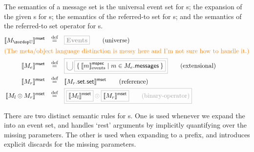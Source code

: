 \begin{definition}[\mmessageset]

  The semantics of a message set is the universal event set for \muniversemessageset s;
  the expansion of the given \mmessagespec s for \mextensionalmessageset s;
  the semantics of the referred-to set for \mrefmessageset s;
  and the semantics of the referred-to set operator for \mbinarymessageset s.
%
\begin{align*}
  \msgsetsema{\aumsgset}
  \quad\defeq\quad
  &
    \tlang{\events}
    \tag{universe}
  \\
  \intertext{\todo{The meta/object language distinction is messy here
  and I'm not sure how to handle it.}}
  \msgsetsema{\anemsgset}
  \quad\defeq\quad
  &
    \tlang{
    \bigcup
    \olang{
    \Set{
    \emspecsema{\amspec} | \amspec \in \field{\anemsgset}{messages}
    }
    }
    }
    \tag{extensional}
  \\
  \msgsetsema{\armsgset}
  \quad\defeq\quad
  &
    \msgsetsema{\field{\field{\armsgset}{set}}{set}}
    \tag{reference}
  \\
  \msgsetsema{\amsgset_l \odot \amsgset_r}
  \quad\defeq\quad
  &
  \tlang{
    \olang{\msgsetsema{\amsgset_l}}
    \odot
    \olang{\msgsetsema{\amsgset_r}}
    \tag{binary-operator}
  }
\end{align*}
\end{definition}

There are two distinct semantic rules for \mmessagespec s.  One is used whenever
we expand the \mmessagespec{} into an event set, and handles `rest' arguments
by implicitly quantifying over the missing parameters.  The other is used when
expanding to a prefix, and introduces explicit discards for the missing
parameters.  

